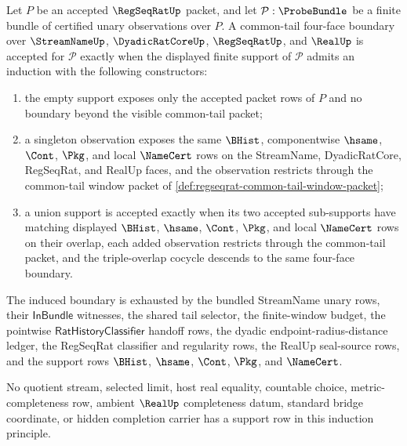 \begin{theorem}
\label{thm:regseqrat-common-tail-support-induction}
Let $P$ be an accepted $\RegSeqRatUp$ packet, and let $\mathcal P:\ProbeBundle$ be a finite bundle of certified unary observations over $P$. A common-tail four-face boundary over $\StreamNameUp$, $\DyadicRatCoreUp$, $\RegSeqRatUp$, and $\RealUp$ is accepted for $\mathcal P$ exactly when the displayed finite support of $\mathcal P$ admits an induction with the following constructors:
\begin{enumerate}
\item the empty support exposes only the accepted packet rows of $P$ and no boundary beyond the visible common-tail packet;
\item a singleton observation exposes the same $\BHist$, componentwise $\hsame$, $\Cont$, $\Pkg$, and local $\NameCert$ rows on the StreamName, DyadicRatCore, RegSeqRat, and RealUp faces, and the observation restricts through the common-tail window packet of \autoref{def:regseqrat-common-tail-window-packet};
\item a union support is accepted exactly when its two accepted sub-supports have matching displayed $\BHist$, $\hsame$, $\Cont$, $\Pkg$, and local $\NameCert$ rows on their overlap, each added observation restricts through the common-tail packet, and the triple-overlap cocycle descends to the same four-face boundary.
\end{enumerate}
The induced boundary is exhausted by the bundled StreamName unary rows, their $\mathsf{InBundle}$ witnesses, the shared tail selector, the finite-window budget, the pointwise $\mathsf{RatHistoryClassifier}$ handoff rows, the dyadic endpoint-radius-distance ledger, the RegSeqRat classifier and regularity rows, the RealUp seal-source rows, and the support rows $\BHist$, $\hsame$, $\Cont$, $\Pkg$, and $\NameCert$.

No quotient stream, selected limit, host real equality, countable choice, metric-completeness row, ambient $\RealUp$ completeness datum, standard bridge coordinate, or hidden completion carrier has a support row in this induction principle.
\end{theorem}
